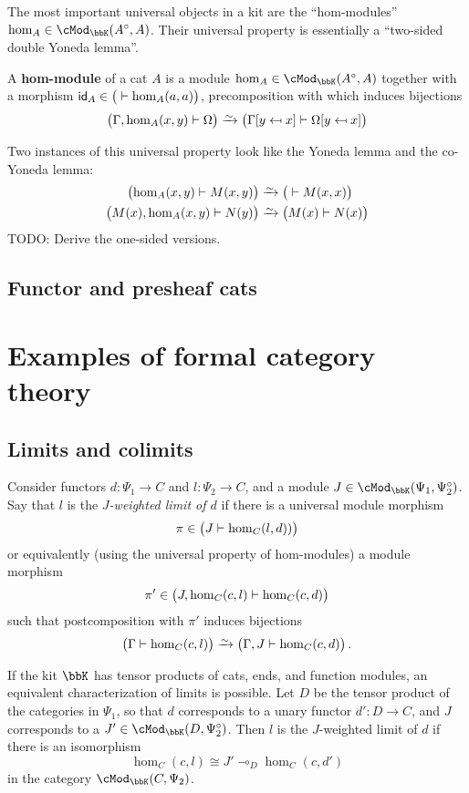 \documentclass{amsart}
\newcommand{\K}{\bbK}
\let\mod\cMod
\def\modk{\mod_\K}
\def\mor#1{\hom_{#1}}
\renewcommand{\o}{^{\circ}}
\let\mto\vdash    %
\def\mhom#1#2{\left( #1 \vphantom{\big|}\mto #2 \right)}
\newcommand{\subst}[3]{{#1}[#2 \mapsfrom #3]}
\renewcommand{\id}{\mathsf{id}}
\begin{document}
The most important universal objects in a kit are the ``hom-modules'' $\mor A \in \modk(A\o,A)$.
Their universal property is essentially a ``two-sided double Yoneda lemma''.

\begin{defn}
  A \textbf{hom-module} of a cat $A$ is a module $\mor A \in \modk(A\o,A)$ together with a morphism $\id_A \in \mhom{}{\mor A(a,a)}$, precomposition with which induces bijections
  \[ \mhom{\Gamma,\mor A(x,y)}{\Omega} \toiso
  \mhom{\subst\Gamma y x}{\subst\Omega y x}
  \]
\end{defn}

Two instances of this universal property look like the Yoneda lemma and the co-Yoneda lemma:
\begin{align*}
  \mhom{\mor A(x,y)}{M(x,y)} &\toiso \mhom{}{M(x,x)}\\
  \mhom{M(x),\mor A(x,y)}{N(y)} &\toiso \mhom{M(x)}{N(x)}
\end{align*}
TODO: Derive the one-sided versions.


\subsection{Functor and presheaf cats}
\label{sec:func-pshf}


\section{Examples of formal category theory}
\label{sec:examples}

\subsection{Limits and colimits}

Consider functors $d:\Psi_1\to C$ and $l:\Psi_2\to C$, and a module $J\in\modk(\Psi_1,\Psi_2\o)$.
Say that $l$ is the \emph{$J$-weighted limit of $d$} if there is a universal module morphism
\[ \pi \in \mhom{J}{\mor{C}(l,d))} \]
or equivalently (using the universal property of hom-modules) a module morphism
\[ \pi' \in \mhom{J,\mor{C}(c,l)}{\mor{C}(c,d)} \]
such that postcomposition with $\pi'$ induces bijections
\[ \mhom{\Gamma}{\mor{C}(c,l)} \toiso \mhom{\Gamma,J}{\mor{C}(c,d)}. \]

If the kit $\K$ has tensor products of cats, ends, and function modules, an equivalent characterization of limits is possible.
Let $D$ be the tensor product of the categories in $\Psi_1$, so that $d$ corresponds to a unary functor $d':D\to C$, and $J$ corresponds to a $J'\in\modk(D,\Psi_2\o)$.
Then $l$ is the $J$-weighted limit of $d$ if there is an isomorphism
\[ \mor{C}(c,l) \cong J' \multimap_D \mor{C}(c,d') \]
in the category $\modk(C,\Psi_2)$.
\end{document}

